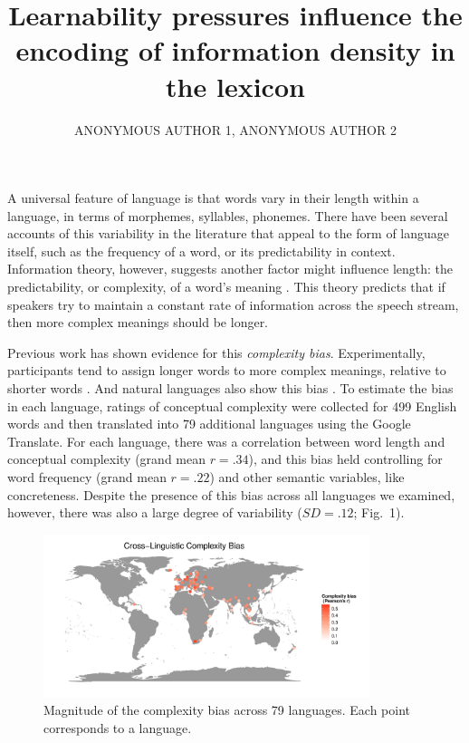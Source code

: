 \documentclass{evolang11}
\begin{document}
\title{Learnability pressures influence the encoding of information density in the lexicon}

\author{ANONYMOUS AUTHOR 1, ANONYMOUS AUTHOR 2}

\address{University Department, University Name \\ City, Country\\email1@university, email2@university}  

\maketitle



A universal feature of language is that words vary in their length within a language, in terms of morphemes, syllables, phonemes. There have been several accounts of this variability in the literature that appeal to the form of language itself, such as the frequency of a word, or its predictability in context. Information theory, however, suggests another factor might influence length: the predictability, or complexity, of a word's meaning \cite{frank2008speaking}. This theory predicts that if speakers try to maintain a constant rate of information  across the speech stream, then more complex meanings should be longer. 

Previous work has shown evidence for this {\it complexity bias}. Experimentally, participants tend to assign longer words to more complex meanings, relative to shorter words \cite{lewisstructure2014}. And natural languages also show this bias \cite{lewisFrankUR}. To estimate the bias in each language, ratings of conceptual complexity were collected for 499 English words and then translated into 79 additional languages using the Google Translate. For each language, there was a correlation between word length and conceptual complexity (grand mean $r =  .34$), and this bias held controlling for word frequency (grand mean $r = .22$) and other semantic variables, like concreteness. Despite the presence of this bias across all languages we examined, however, there was also a large degree of variability ($SD = .12$;  Fig.\ 1). 

 
\begin{figure}
\includegraphics[width=3.75in]{Fig1.pdf}
\caption{Magnitude of the complexity bias across 79 languages. Each point corresponds to a language. \label{fig1}}
\end{figure}
\end{document}
